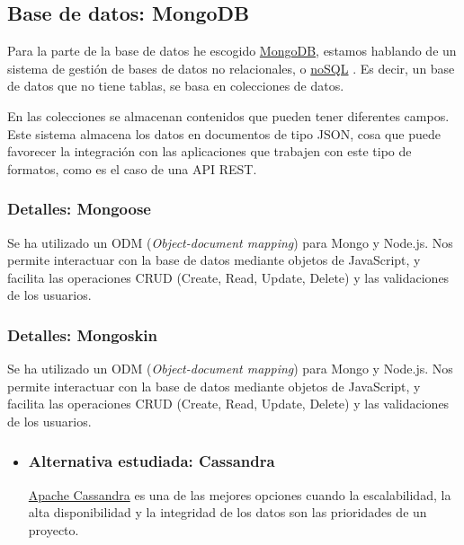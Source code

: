 \subsection{Base de datos: MongoDB}\label{tecnologias_mongodb}
Para la parte de la base de datos he escogido \hyperlink{https://www.mongodb.com/}{MongoDB}, estamos hablando de un sistema de gestión de bases de datos no relacionales, o \hyperlink{https://es.wikipedia.org/wiki/NoSQL}{noSQL} . Es decir, un base de datos que no tiene tablas, se basa en colecciones de datos.

En las colecciones se almacenan contenidos que pueden tener diferentes campos. Este sistema almacena los datos en documentos de tipo JSON, cosa que puede favorecer la integración con las aplicaciones que trabajen con este tipo de formatos, como es el caso de una API REST. 


\subsubsection{Detalles: Mongoose}\label{mongoose}
Se ha utilizado un ODM (\emph{Object-document mapping}) para Mongo y Node.js. Nos permite interactuar con la base de datos mediante objetos de JavaScript, y facilita las operaciones CRUD (Create, Read, Update, Delete) y las validaciones de los usuarios.

\subsubsection{Detalles: Mongoskin}\label{mongoskin}
Se ha utilizado un ODM (\emph{Object-document mapping}) para Mongo y Node.js. Nos permite interactuar con la base de datos mediante objetos de JavaScript, y facilita las operaciones CRUD (Create, Read, Update, Delete) y las validaciones de los usuarios.

\begin{itemize}
	\item	\subsubsection{Alternativa estudiada: Cassandra}\label{cassandra}
	\hyperlink{https://www.cassandra.apache.org/}{Apache Cassandra} es una de las mejores opciones cuando la escalabilidad, la alta disponibilidad y la integridad de los datos son las prioridades de un proyecto.
\end{itemize}



